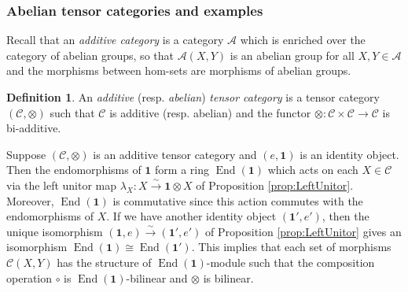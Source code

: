 \documentclass[10pt]{amsart}
\numberwithin{equation}{section}
\def\~#1{\mathscr{#1}}
\newcommand{\isom}{\xrightarrow{\sim}}
\DeclareMathOperator{\End}{End}
\theoremstyle{plain}
\theoremstyle{definition}
\newtheorem{defn}[thm]{Definition}
\theoremstyle{remark}
\begin{document}
\subsubsection{Abelian tensor categories and examples} Recall that an \emph{additive category} is a category $\~A$ which is enriched over the category of abelian groups, so that $\~A(X, Y)$ is an abelian group for all $X, Y \in \~A$ and the morphisms between hom-sets are morphisms of abelian groups.

\begin{defn}
    An \emph{additive} (resp. \emph{abelian}) \emph{tensor category} is a tensor category $(\~C, \otimes)$ such that $\~C$ is additive (resp. abelian) and the functor $\otimes: \~C \times \~C \to \~C$ is bi-additive.
\end{defn} 

Suppose $(\~C, \otimes)$ is an additive tensor category and $(e, \mathbf{1})$ is an identity object. Then the endomorphisms of $\mathbf{1}$ form a ring $\End(\mathbf{1})$ which acts on each $X \in \~C$ via the left unitor map $\lambda_X: X \isom \mathbf{1} \otimes X$ of Proposition \ref{prop:LeftUnitor}. Moreover, $\End(\mathbf{1})$ is commutative since this action commutes with the endomorphisms of $X$. If we have another identity object $(\mathbf{1}', e')$, then the unique isomorphism $(\mathbf{1}, e) \isom (\mathbf{1}',e')$ of Proposition \ref{prop:LeftUnitor} gives an isomorphism $\End(\mathbf{1}) \cong \End(\mathbf{1}')$. This implies that each set of morphisms $\~C(X, Y)$ has the structure of $\End(\mathbf{1})$-module such that the composition operation $\circ$ is $\End(\mathbf{1})$-bilinear and $\otimes$ is bilinear.
\end{document}

